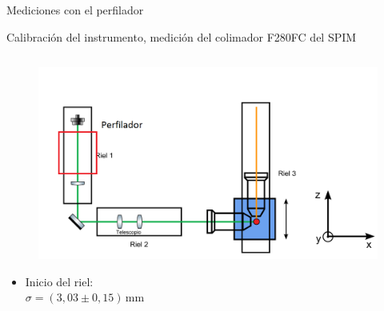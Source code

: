 
\begin{frame}{Mediciones con el perfilador}

        Calibración del instrumento, medición del colimador F280FC del SPIM
        \begin{columns}[t]
            \begin{column}{0.5\textwidth}
                \begin{figure}[H]
                \centering
                \includegraphics[width=\textwidth]{fig/perfilador/spim_riel_perfilador.png}
                \label{fig:spim_riel_perfilador}
                \end{figure}
                
                 \begin{itemize}
                    \item Inicio del riel:\\ $\sigma = (3,03 \pm 0,15)\,\text{mm}$
                \end{itemize}
                
            \end{column}


\end{columns}
\end{frame}
